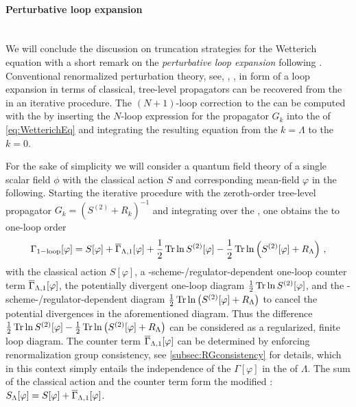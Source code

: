 \paragraph{Perturbative loop expansion}\label{paragraph:loopExpansion}\mbox{} \\
We will conclude the discussion on truncation strategies for the Wetterich equation with a short remark on the \textit{perturbative loop expansion} following .
Conventional renormalized perturbation theory, see, \eg{}, , in form of a loop expansion in terms of classical, tree-level propagators can be recovered from the \frg{} in an iterative procedure. 
The $(N+1)$-loop correction to the \ea{} can be computed with the \frgEquation{} by inserting the $N$-loop expression for the propagator $G_k$ into the \rhs{} of \cref{eq:WetterichEq} and integrating the resulting equation from the \uv{} $k=\Lambda$ to the \ir{} $k=0$.

For the sake of simplicity we will consider a quantum field theory of a single scalar field $\phi$ with the classical action $S$ and corresponding mean-field $\varphi$ in the following.
Starting the iterative procedure with the zeroth-order tree-level propagator $G_k=(S^{(2)}+R_k)^{-1}$ and integrating over the \rgscale{}, one obtains the \ea{} to one-loop order
\begin{align}
	\Gamma_{1-\mathrm{loop}}[\varphi]=S[\varphi]+\FSeaa_{\Lambda,1}[\varphi]+\frac{1}{2}\Tr\ln S^{(2)}[\varphi]-\frac{1}{2}\Tr\ln \del[2]{S^{(2)}[\varphi]+R_\Lambda}\, ,
	\label{eq:ea1loop}
\end{align}
with the classical action $S[\varphi]$, a \rg{}-scheme-/regulator-dependent one-loop counter term $\overline{\Gamma}_{\Lambda,1}[\varphi]$, the potentially divergent one-loop diagram $\frac{1}{2}\operatorname{Tr}\ln S^{(2)}[\varphi]$, and the \rg{}-scheme-/regulator-dependent diagram $\frac{1}{2}\Tr\ln \del[1]{S^{(2)}[\varphi]+R_\Lambda}$ to cancel the potential divergences in the aforementioned diagram.
Thus the difference $\frac{1}{2}\Tr\ln S^{(2)}[\varphi]-\frac{1}{2}\Tr\ln \del[1]{S^{(2)}[\varphi]+R_\Lambda}$ can be considered as a regularized, finite loop diagram.
The counter term $\overline{\Gamma}_{\Lambda,1}[\varphi]$ can be determined by enforcing renormalization group consistency, see \cref{subsec:RGconsistency} for details, which in this context simply entails the independence of the \ea{} $\Gamma[\varphi]$ in the \ir{} of $\Lambda$.
The sum of the classical action and the counter term form the modified \ic{}: $S_\Lambda[\varphi]=S[\varphi]+\overline{\Gamma}_{\Lambda,1}[\varphi]$.

